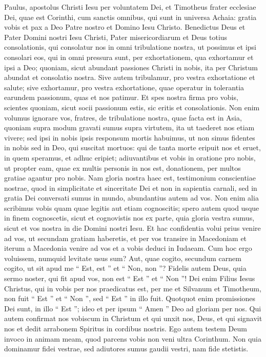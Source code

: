 \begin{biblechapter}
 \verse Paulus, apostolus Christi Iesu per voluntatem Dei, et Timotheus frater ecclesiae Dei, quae est Corinthi, cum sanctis omnibus, qui sunt in universa Achaia: 
\verse gratia vobis et pax a Deo Patre nostro et Domino Iesu Christo.
 \verse Benedictus Deus et Pater Domini nostri Iesu Christi, Pater misericordiarum et Deus totius consolationis, 
\verse qui consolatur nos in omni tribulatione nostra, ut possimus et ipsi consolari eos, qui in omni pressura sunt, per exhortationem, qua exhortamur et ipsi a Deo; 
\verse quoniam, sicut abundant passiones Christi in nobis, ita per Christum abundat et consolatio nostra. 
\verse Sive autem tribulamur, pro vestra exhortatione et salute; sive exhortamur, pro vestra exhortatione, quae operatur in tolerantia earundem passionum, quas et nos patimur. 
\verse Et spes nostra firma pro vobis, scientes quoniam, sicut socii passionum estis, sic eritis et consolationis.
 \verse Non enim volumus ignorare vos, fratres, de tribulatione nostra, quae facta est in Asia, quoniam supra modum gravati sumus supra virtutem, ita ut taederet nos etiam vivere; 
\verse sed ipsi in nobis ipsis responsum mortis habuimus, ut non simus fidentes in nobis sed in Deo, qui suscitat mortuos: 
\verse qui de tanta morte eripuit nos et eruet, in quem speramus, et adhuc eripiet; 
\verse adiuvantibus et vobis in oratione pro nobis, ut propter eam, quae ex multis personis in nos est, donationem, per multos gratiae agantur pro nobis.
 \verse Nam gloria nostra haec est, testimonium conscientiae nostrae, quod in simplicitate et sinceritate Dei et non in sapientia carnali, sed in gratia Dei conversati sumus in mundo, abundantius autem ad vos. 
\verse Non enim alia scribimus vobis quam quae legitis aut etiam cognoscitis; spero autem quod usque in finem cognoscetis, 
\verse sicut et cognovistis nos ex parte, quia gloria vestra sumus, sicut et vos nostra in die Domini nostri Iesu.
 \verse Et hac confidentia volui prius venire ad vos, ut secundam gratiam haberetis, 
\verse et per vos transire in Macedoniam et iterum a Macedonia venire ad vos et a vobis deduci in Iudaeam. 
\verse Cum hoc ergo voluissem, numquid levitate usus sum? Aut, quae cogito, secundum carnem cogito, ut sit apud me “ Est, est ” et “ Non, non ”? 
\verse Fidelis autem Deus, quia sermo noster, qui fit apud vos, non est “ Est ” et “ Non ”! 
\verse Dei enim Filius Iesus Christus, qui in vobis per nos praedicatus est, per me et Silvanum et Timotheum, non fuit “ Est ” et “ Non ”, sed “ Est ” in illo fuit. 
\verse Quotquot enim promissiones Dei sunt, in illo “ Est ”; ideo et per ipsum “ Amen ” Deo ad gloriam per nos. 
\verse Qui autem confirmat nos vobiscum in Christum et qui unxit nos, Deus, 
\verse et qui signavit nos et dedit arrabonem Spiritus in cordibus nostris.
 \verse Ego autem testem Deum invoco in animam meam, quod parcens vobis non veni ultra Corinthum. 
\verse Non quia dominamur fidei vestrae, sed adiutores sumus gaudii vestri, nam fide stetistis.
 

\end{biblechapter}
